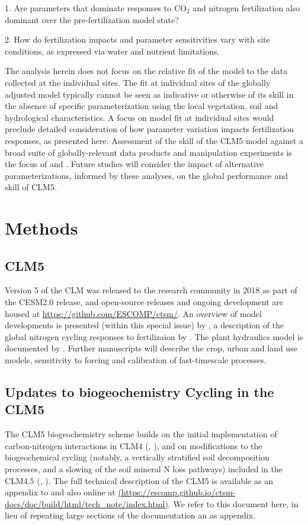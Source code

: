 \documentclass[draft,linenumbers]{agujournal}
\begin{document}
1. Are parameters that dominate responses to CO$_{2}$ and nitrogen fertilization also dominant over the pre-fertilization model state?

2. How do fertilization impacts and parameter sensitivities vary with site conditions, as expressed via water and nutrient limitations. 

The analysis herein does not focus on the relative fit of the model to the data collected at the individual sites. The fit at individual sites of the globally adjusted model typically cannot be seen as indicative or otherwise of its skill in the absence of specific parameterization using the local vegetation, soil and hydrological characteristics. A focus on model fit at individual sites would preclude detailed consideration of how parameter variation impacts fertilization responses, as presented here. Assessment of the skill of the CLM5 model against a broad suite of globally-relevant data products and manipulation experiments is the focus of \cite{lawrence2018} and \cite{wieder2019}. Future studies will consider the impact of alternative parameterizations, informed by these analyses, on the global performance and skill of CLM5.

\section{Methods}

\subsection{CLM5}
 Version 5 of the CLM was released to the research community in 2018 as part of the CESM2.0 release, and open-source releases and ongoing development are housed at \url{https://github.com/ESCOMP/ctsm/}. An overview of model developments is presented (within this special issue) by \cite{lawrence2018}, a description of the global nitrogen cycling responses to fertilizaion by \cite{wieder2019}. The plant hydraulics model is documented by \cite{kennedy2019}. Further manuscripts will describe the crop, urban and land use models, sensitivity to forcing and calibration of fast-timescale processes.
 
\subsection{Updates to biogeochemistry Cycling in the CLM5}
The CLM5 biogeochemistry scheme builds on the initial implementation of carbon-nitrogen interactions in CLM4 (\cite{thornton2007}, \cite{lawrence2011}),  and on modifications to the biogeochemical cycling (notably, a vertically stratified soil decomposition processes, and a slowing of the soil mineral N loss pathways) included in the CLM4.5 (\cite{bonan2012}, \cite{koven2013}). The full technical description of the CLM5 is available as an appendix to \cite{lawrence2018} and also online at \url{(https://escomp.github.io/ctsm-docs/doc/build/html/tech_note/index.html)}. We refer to this document here, in lieu of repeating large sections of the documentation an as appendix.
\end{document}
